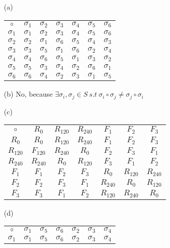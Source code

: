 \documentclass[titlepage]{article}
\begin{document}
\begin{itemize}
\item[(a)]
\begin{tabular}{|c| c c c c c c}
    $\circ$ & $\sigma_1$ & $\sigma_2$ & $\sigma_3$ & $\sigma_4$ & $\sigma_5$ & $\sigma_6$  \\
    \cline{1-7}
    $\sigma_1$ & $\sigma_1$ & $\sigma_2$ & $\sigma_3$ & $\sigma_4$ & $\sigma_5$ & $\sigma_6$\\
    $\sigma_2$ & $\sigma_2$ & $\sigma_1$ & $\sigma_6$ & $\sigma_5$ & $\sigma_4$ & $\sigma_3$ \\
    $\sigma_3$ & $\sigma_ 3$ & $\sigma_5$ & $\sigma_1$ & $\sigma_6$ & $\sigma_2$ &$\sigma_4$\\
    $\sigma_4$ & $\sigma_4$ & $\sigma_6$ & $\sigma_5$ & $\sigma_1$ & $\sigma_3$ &$\sigma_2$\\
    $\sigma_5$ & $\sigma_5$ & $\sigma_3$ & $\sigma_4 $& $\sigma_2$ & $\sigma_6$ &$\sigma_1$\\
    $\sigma_6$ & $\sigma_6$ & $\sigma_4$ & $\sigma_2$ & $\sigma_3$ & $\sigma_1$ & $\sigma_5$
\end{tabular}
\item[(b)] No, because $\exists \sigma_i,\sigma_j \in S \ s.t \ \sigma_i \circ \sigma_j \neq \sigma_j \circ \sigma_i$
\item[(c)]\begin{tabular}{|c| c c c c c c}
    $\circ$ & $R_0$ & $R_{120}$ & $R_{240}$ & $F_1$ & $F_2$ & $F_3$  \\
    \cline{1-7}
    $R_0$ & $R_0$ & $R_{120}$ & $R_{240}$ & $F_1$ & $F_2$ & $F_3$\\
    $R_{120}$ & $F_{120}$ & $R_{240}$ & $R_0$ & $F_2$ & $F_3$ & $F_1$ \\
    $R_{240}$ & $R_{240}$ & $R_0$ & $R_{120}$ & $F_3$ & $F_1$ &$F_2$\\
    $F_1$ & $F_1$ & $F_2$ & $F_3$ & $R_0$ & $R_{120}$ &$R_{240}$\\
    $F_2$ & $F_2$ & $F_3$ & $F_1$& $R_{240}$ & $R_0$ & $R_{120}$\\
    $F_3$ & $F_3$ & $F_1$ & $F_2$ & $R_{120}$ & $R_{240}$ & $R_0$
\end{tabular}
\item[(d)]\begin{tabular}{|c| c c c c c c}
    $\circ$ & $\sigma_1$ & $\sigma_5$ & $\sigma_6$ & $\sigma_2$ & $\sigma_3$ & $\sigma_4$  \\
    \cline{1-7}
    $\sigma_1$ & $\sigma_1$ & $\sigma_5$ & $\sigma_6$ & $\sigma_2$ & $\sigma_3$ & $\sigma_4$\\

\end{tabular}
\end{itemize}
\end{document}
